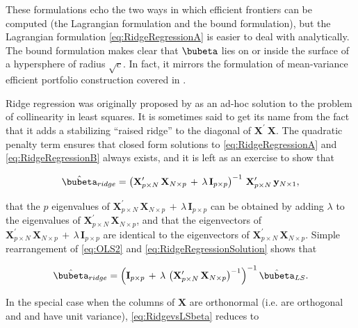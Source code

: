 \documentclass[graybox,envcountchap,sectrefs]{svmono}\usepackage[]{graphicx}\usepackage[]{xcolor}
\begin{document}
\begin{appendices}
These formulations echo the two ways in which efficient frontiers
can be computed (the Lagrangian formulation and the bound formulation),
but the Lagrangian formulation \eqref{eq:RidgeRegressionA} is easier
to deal with analytically. The bound formulation makes clear that
$\bubeta$ lies on or inside the surface of a hypersphere of radius
$\sqrt{c}.$ In fact, it mirrors the formulation of mean-variance
efficient portfolio construction covered in \FoundationsChapter. 

Ridge regression was originally proposed by \citet{HoerlKennard1970}
as an ad-hoc solution to the problem of collinearity in least squares.
It is sometimes said to get its name from the fact that it adds a
stabilizing ``raised ridge'' to the diagonal of $\mathrm{\mathbf{X}}^{\prime}\ \mathrm{\mathbf{X}}$.
The quadratic penalty term ensures that closed form solutions to \eqref{eq:RidgeRegressionA}
and \eqref{eq:RidgeRegressionB} always exists, and it is left as
an exercise to show that 

\begin{equation}
\hat{\bubeta}_{ridge}=\left(\mathrm{\mathbf{X}}_{p\times N}^{\prime}\,\mathrm{\mathbf{X}}_{N\times p}\,+\,\lambda\,\mathbf{I}_{p\times p}\right)^{-1}\,\mathrm{\mathbf{X}}_{p\times N}^{\prime}\,\mathrm{\mathbf{y}}_{N\times1},\label{eq:RidgeRegressionSolution}
\end{equation}

that the $p$ eigenvalues of $\mathrm{\mathbf{X}}_{p\times N}^{\prime}\,\mathrm{\mathbf{X}}_{N\times p}\,+\,\lambda\,\mathbf{I}_{p\times p}$
can be obtained by adding $\lambda$ to the eigenvalues of $\mathrm{\mathbf{X}}_{p\times N}^{\prime}\,\mathrm{\mathbf{X}}_{N\times p}$,
and that the eigenvectors of $\mathrm{\mathbf{X}}_{p\times N}^{\prime}\,\mathrm{\mathbf{X}}_{N\times p}\,+\,\lambda\,\mathbf{I}_{p\times p}$
are identical to the eigenvectors of $\mathrm{\mathbf{X}}_{p\times N}^{\prime}\,\mathrm{\mathbf{X}}_{N\times p}$.
Simple rearrangement of \eqref{eq:OLS2} and \eqref{eq:RidgeRegressionSolution}
shows that

\begin{equation}
\hat{\bubeta}_{ridge}=\left(\mathbf{I}_{p\times p}\,+\,\lambda\,\left(\mathrm{\mathbf{X}}_{p\times N}^{\prime}\,\mathrm{\mathbf{X}}_{N\times p}\right)^{-1}\right)^{-1}\hat{\bubeta}_{LS}.\label{eq:RidgevsLSbeta}
\end{equation}

In the special case when the columns of $\mathbf{X}$ are orthonormal
(i.e. are orthogonal and and have unit variance), \eqref{eq:RidgevsLSbeta}
reduces to


\end{appendices}
\end{document}
